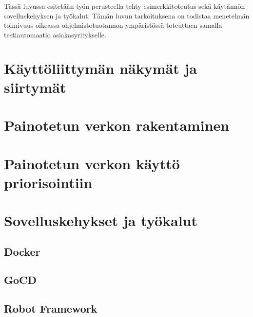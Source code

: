 Tässä luvussa esitetään työn perusteella tehty esimerkkitoteutus sekä käytännön sovelluskehyksen ja työkalut.
Tämän luvun tarkoituksena on todistaa menetelmän toimivuus oikeassa ohjelmistotuotannon ympäristössä toteuttaen samalla testiautomaatio asiakasyritykselle.

\section{Käyttöliittymän näkymät ja siirtymät} \label{11_kayttoliittyman_nakymat_ja_siirtymat}


\section{Painotetun verkon rakentaminen} \label{11_painotetun_verkon_rakentaminen}


\section{Painotetun verkon käyttö priorisointiin} \label{11_painotetun_verkon_kaytto_priorisointiin}


\section{Sovelluskehykset ja työkalut} \label{11_sovelluskehykset_ja_tyokalut}


  \subsection{Docker} \label{11_docker}


  \subsection{GoCD} \label{11_gocd}


  \subsection{Robot Framework} \label{11_robot_framework}


